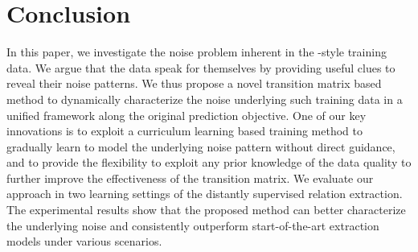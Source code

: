 \section{Conclusion}
In this paper, we investigate the noise problem inherent in  the \DS-style training data.
 We argue that the data speak for themselves by providing useful clues to reveal their noise patterns.
We thus propose a novel transition matrix based method to dynamically characterize the noise underlying such training data in a unified framework along  the original prediction objective.
One of our key innovations is to exploit a curriculum learning based training method to gradually  learn to model  the underlying noise pattern without direct guidance, and to provide the flexibility to exploit any prior knowledge of the data quality to further improve the effectiveness of the transition matrix.
We evaluate our approach in two learning settings of the distantly supervised relation extraction. The experimental results show
that the proposed method can better characterize the underlying noise and consistently outperform start-of-the-art extraction models under various scenarios.

